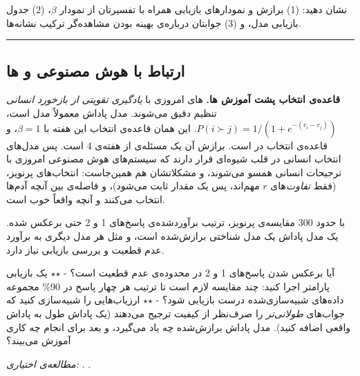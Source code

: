 \subsubsection{\texorpdfstring{}{lab check-off}}

نشان دهید: (1) برازش  و نمودارهای بازیابی همراه با تفسیرتان از
نمودار \(\beta\)، (2) جدول بازیابی مدل، و (3) جوابتان درباره‌ی بهینه بودن
مشاهده‌گر ترکیب نشانه‌ها.

\begin{center}\rule{0.5\linewidth}{0.5pt}\end{center}

\subsection{\texorpdfstring{ارتباط با هوش مصنوعی و
ها}{ارتباط با هوش مصنوعی و LLMها}}

\textbf{قاعده‌ی انتخاب پشت آموزش ها.} های امروزی
با \emph{یادگیری تقویتی از بازخورد انسانی}  تنظیم دقیق
 می‌شوند. مدل پاداش معمولاً مدل
\textbf{} است،
\(P(i \succ j) = 1/(1 + e^{-(r_i - r_j)})\). این همان قاعده‌ی انتخاب
 این هفته با \(\beta = 1\)، و قاعده‌ی انتخاب  در
 است. برازش آن یک مسئله‌ی  از هفته‌ی 4 است. پس مدل‌های
انتخاب انسانی در قلب شیوه‌ای قرار دارند که سیستم‌های هوش مصنوعی امروزی با
ترجیحات انسانی همسو  می‌شوند، و مشکلاتشان هم همین‌جاست:
انتخاب‌های پرنویز،  (فقط \emph{تفاوت}‌های \(r\)
مهم‌اند، پس یک مقدار ثابت می‌شود)، و فاصله‌ی بین آنچه آدم‌ها انتخاب می‌کنند و
آنچه واقعاً خوب است.

با حدود 300 مقایسه‌ی پرنویز، ترتیب برآوردشده‌ی پاسخ‌های 1 و 2 حتی برعکس
شده. یک مدل پاداش یک مدل شناختی برازش‌شده است، و مثل هر مدل دیگری به
برآورد عدم قطعیت و بررسی بازیابی نیاز دارد.

آیا برعکس شدن پاسخ‌های 1 و 2 در محدوده‌ی عدم قطعیت است؟ - \ensuremath{\star}\ensuremath{\star} یک بازیابی
پارامتر اجرا کنید: چند مقایسه لازم است تا ترتیب هر چهار پاسخ در 90\%
مجموعه داده‌های شبیه‌سازی‌شده درست بازیابی شود؟ - \ensuremath{\star}\ensuremath{\star} ارزیاب‌هایی را شبیه‌سازی
کنید که جواب‌های \emph{طولانی‌تر} را صرف‌نظر از کیفیت ترجیح می‌دهند (یک
پاداش طول به پاداش واقعی اضافه کنید). مدل پاداش برازش‌شده چه یاد می‌گیرد،
و بعد  برای انجام چه کاری آموزش می‌بیند؟

\emph{مطالعه‌ی اختیاری:}  \emph{}.
 \emph{}.

